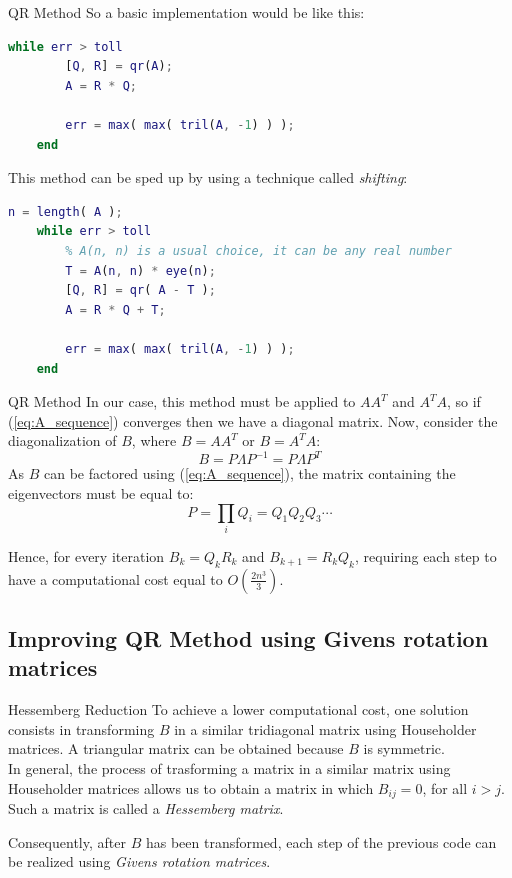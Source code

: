 \documentclass[10pt]{beamer}
\begin{document}
\begin{frame}[fragile]{QR Method}
    So a basic implementation would be like this:
    \begin{lstlisting}[language=Matlab]
    while err > toll
        [Q, R] = qr(A);
        A = R * Q;

        err = max( max( tril(A, -1) ) );
    end \end{lstlisting}
    This method can be sped up by using a technique called \textit{shifting}:
    \begin{lstlisting}[language=Matlab]
    n = length( A );
    while err > toll
        % A(n, n) is a usual choice, it can be any real number
        T = A(n, n) * eye(n);
        [Q, R] = qr( A - T );
        A = R * Q + T;

        err = max( max( tril(A, -1) ) );
    end \end{lstlisting}
\end{frame}

\begin{frame}{QR Method}
    In our case, this method must be applied to $A A^T$ and $A^T A$, so if (\ref{eq:A_sequence}) converges then we have a diagonal matrix. \newline
    Now, consider the diagonalization of $B$, where $B = A A^T$ or $B = A^T A$:
    $$
    B = P \Lambda P^{-1} =  P \Lambda P^T
    $$
    As $B$ can be factored using (\ref{eq:A_sequence}), the matrix containing the eigenvectors must be equal to:
    $$
    P = \prod_i Q_i = Q_1 Q_2 Q_3 \cdots
    $$ \bigskip

    Hence, for every iteration $B_k = Q_k R_k$ and $B_{k+1} = R_k Q_k$, requiring each step to have a computational cost equal to $O(\frac{2 n^3}{3})$.
\end{frame}

\subsection{Improving QR Method using Givens rotation matrices}

\begin{frame}{Hessemberg Reduction}
    To achieve a lower computational cost, one solution consists in transforming $B$ in a similar tridiagonal matrix using Householder matrices. \newline
    A triangular matrix can be obtained because $B$ is symmetric. \\  \bigskip
    In general, the process of trasforming a matrix in a similar matrix using Householder matrices allows us to obtain a matrix in which $B_{ij} = 0$, for all $i > j$. Such a matrix is called a \textit{Hessemberg matrix}. \bigskip

    Consequently, after $B$ has been transformed, each step of the previous code can be realized using \textit{Givens rotation matrices}.
\end{frame}
\end{document}
